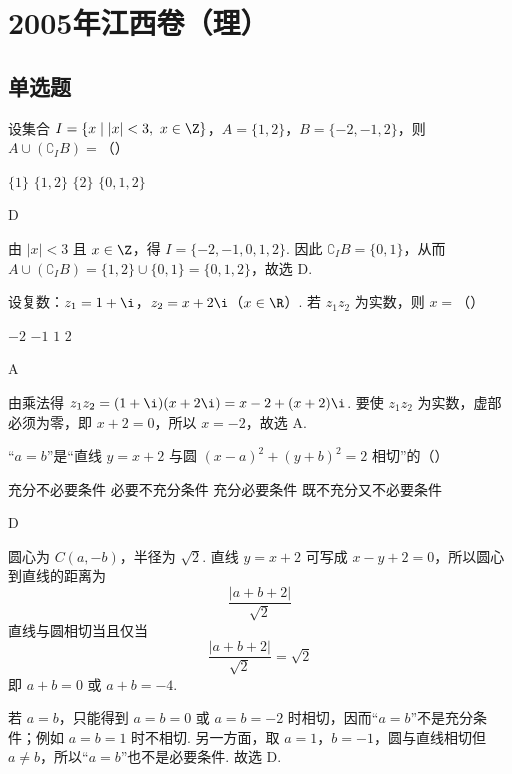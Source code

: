 \chapter{2005年江西卷（理）}
\section{单选题}
\begin{problem}
设集合 \(I=\{x\mid |x|<3,\ x\in\Z\}\)，\(A=\{1,2\}\)，\(B=\{-2,-1,2\}\)，则 \(A\cup(\complement_I B)=\)（\quad）

\choices
    {\(\{1\}\)}
    {\(\{1,2\}\)}
    {\(\{2\}\)}
    {\(\{0,1,2\}\)}
\end{problem}

\begin{answer}D\end{answer}

\begin{solution}
由 \(\lvert x\rvert<3\) 且 \(x\in\Z\)，得 \(I=\{-2,-1,0,1,2\}\). 因此
\(\complement_I B=\{0,1\}\)，从而
\(A\cup(\complement_I B)=\{1,2\}\cup\{0,1\}=\{0,1,2\}\)，故选 D.
\end{solution}

\begin{problem}
设复数：\(z_1=1+\i\)，\(z_2=x+2\i\)（\(x\in\R\)）. 若 \(z_1z_2\) 为实数，则 \(x=\)（\quad）

\choices
    {\(-2\)}
    {\(-1\)}
    {\(1\)}
    {\(2\)}
\end{problem}

\begin{answer}A\end{answer}

\begin{solution}
由乘法得 \(z_1z_2=(1+\i)(x+2\i)=x-2+(x+2)\i\). 要使 \(z_1z_2\) 为实数，虚部必须为零，即 \(x+2=0\)，所以 \(x=-2\)，故选 A.
\end{solution}

\begin{problem}
“\(a=b\)”是“直线 \(y=x+2\) 与圆 \((x-a)^2+(y+b)^2=2\) 相切”的（\quad）

\choices
    {充分不必要条件}
    {必要不充分条件}
    {充分必要条件}
    {既不充分又不必要条件}
\end{problem}

\begin{answer}D\end{answer}

\begin{solution}
圆心为 \(C(a,-b)\)，半径为 \(\sqrt2\). 直线 \(y=x+2\) 可写成 \(x-y+2=0\)，所以圆心到直线的距离为
\[
\frac{\lvert a+b+2\rvert}{\sqrt2}
\]
直线与圆相切当且仅当
\[
\frac{\lvert a+b+2\rvert}{\sqrt2}=\sqrt2
\]
即 \(a+b=0\) 或 \(a+b=-4\).

若 \(a=b\)，只能得到 \(a=b=0\) 或 \(a=b=-2\) 时相切，因而“\(a=b\)”不是充分条件；例如 \(a=b=1\) 时不相切. 另一方面，取 \(a=1\)，\(b=-1\)，圆与直线相切但 \(a\ne b\)，所以“\(a=b\)”也不是必要条件. 故选 D.
\end{solution}

